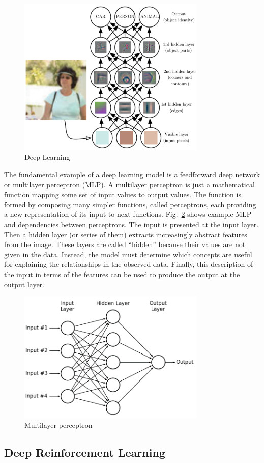 \begin{figure}[H]
\includegraphics[width=0.8\textwidth,keepaspectratio]{figures/DL.png}
\caption[Deep Learning]{Deep Learning \protect\cite{Book.DeepLearning}}
\label{Fig.DL}
\end{figure}

The fundamental example of a deep learning model is a feedforward deep network or multilayer perceptron (MLP). A multilayer perceptron is just a mathematical function mapping some set of input values to output values. The function is formed by composing many simpler functions, called perceptrons, each providing a new representation of its input to next functions. Fig.~\ref{Fig.MLP} shows example MLP and dependencies between perceptrons. The input is presented at the input layer. Then a hidden layer (or series of them) extracts increasingly abstract features from the image. These layers are called “hidden” because their values are not given in the data. Instead, the model must determine which concepts are useful for explaining the relationships in the observed data. Finally, this description of the input in terms of the features can be used to produce the output at the output layer.

\begin{figure}[H]
\includegraphics[width=0.8\textwidth,keepaspectratio]{figures/MLP.png}
\caption{Multilayer perceptron}
\label{Fig.MLP}
\end{figure}


\subsection{Deep Reinforcement Learning}
